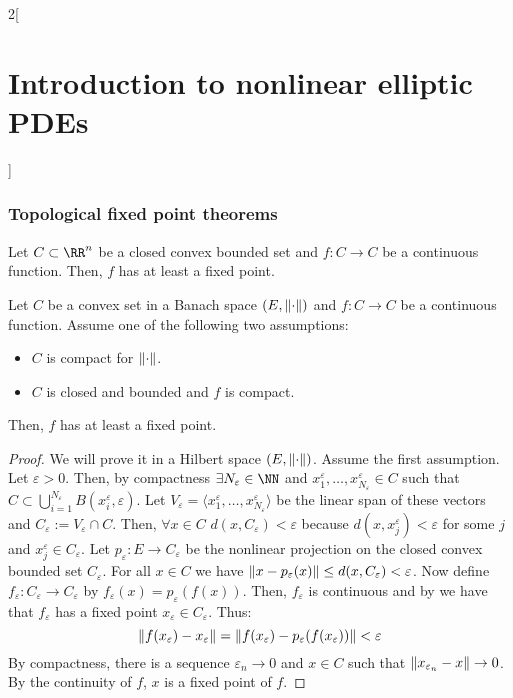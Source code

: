 \documentclass[../../../main_math.tex]{subfiles}
\begin{document}
\begin{multicols}{2}[\section{Introduction to nonlinear elliptic PDEs}]
  \subsubsection{Topological fixed point theorems}
  \begin{theorem}\label{INEPDE:Brower}
    Let $C\subset \RR^n$ be a closed convex bounded set and $f:C\to C$ be a continuous function. Then, $f$ has at least a fixed point.
  \end{theorem}
  \begin{theorem}\label{INEPDE:schauder_fixed_point}
    Let $C$ be a convex set in a Banach space $(E,\norm{\cdot})$ and $f:C\to C$ be a continuous function. Assume one of the following two assumptions:
    \begin{itemize}
      \item $C$ is compact for $\norm{\cdot}$.
      \item $C$ is closed and bounded and $f$ is compact.
    \end{itemize}
    Then, $f$ has at least a fixed point.
  \end{theorem}
  \begin{proof}
    We will prove it in a Hilbert space $(E,\norm{\cdot})$. Assume the first assumption. Let $\varepsilon>0$. Then, by compactness $\exists N_\varepsilon\in\NN$ and $x_1^\varepsilon,\dots,x_{N_\varepsilon}^\varepsilon\in C$ such that $C\subset \bigcup_{i=1}^{N_\varepsilon}B(x_i^\varepsilon,\varepsilon)$. Let $V_\varepsilon=\langle x_1^\varepsilon,\dots,x_{N_\varepsilon}^\varepsilon\rangle$ be the linear span of these vectors and $C_\varepsilon:=V_\varepsilon\cap C$. Then, $\forall x\in C$ $d(x,C_\varepsilon)< \varepsilon$ because $d(x,x_j^\varepsilon)<\varepsilon$ for some $j$ and $x_j^\varepsilon\in C_\varepsilon$. Let $p_\varepsilon:E\to C_\varepsilon$ be the nonlinear projection on the closed convex bounded set $C_\varepsilon$. For all $x\in C$ we have $\norm{x-p_\varepsilon(x)}\leq d(x,C_\varepsilon)<\varepsilon$. Now define $f_\varepsilon:C_\varepsilon\to C_\varepsilon$ by $f_\varepsilon(x)=p_\varepsilon(f(x))$. Then, $f_\varepsilon$ is continuous and by  we have that $f_\varepsilon$ has a fixed point $x_\varepsilon\in C_\varepsilon$. Thus:
    $$
      \norm{f(x_\varepsilon)-x_\varepsilon}=\norm{f(x_\varepsilon)-p_\varepsilon(f(x_\varepsilon))}<\varepsilon
    $$
    By compactness, there is a sequence $\varepsilon_n\to 0$ and $x\in C$ such that $\norm{x_{\varepsilon_n}-x}\to 0$. By the continuity of $f$, $x$ is a fixed point of $f$.


\end{proof}
\end{multicols}
\end{document}
